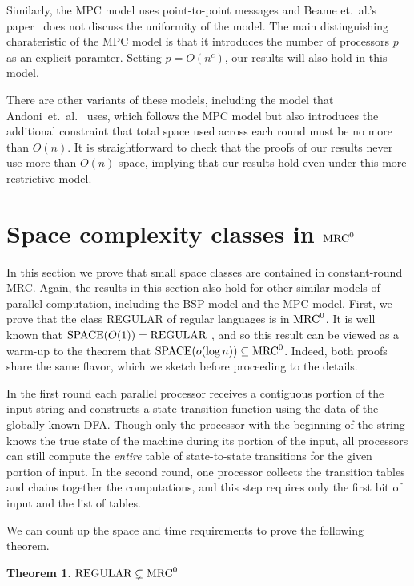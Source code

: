 \documentclass[11pt]{article}
\newtheorem{theorem}{Theorem}
\theoremstyle{definition}
\theoremstyle{remark}
\newcommand{\mrc}{\textup{MRC}}
\begin{document}
Similarly, the MPC model uses point-to-point messages and Beame et.~al.'s paper~\cite{BeameKS13} does not discuss the uniformity of the model.  The main distinguishing charateristic of the MPC model is that it introduces the number of processors $p$ as an explicit paramter.  Setting $p=O(n^c)$, our results will also hold in this model.

There are other variants of these models, including the model that Andoni~et.~al.~\cite{AndoniNOY14} uses, which follows the MPC model but also introduces the additional constraint that total space used across each round must be no more than $O(n)$.  It is straightforward to check that the proofs of our results never use more than $O(n)$ space, implying that our results hold even under this more restrictive model.

\section{Space complexity classes in $\mrc^0$} \label{sec:spacebound}

In this section we prove that small space classes are contained in
constant-round MRC.  Again, the results in this section also hold for other similar models of parallel computation, including the BSP model and the MPC model.  First, we prove that the class REGULAR of regular languages
is in $\mrc^0$. It is well known that $\textup{SPACE}(O(1)) = \textup{REGULAR}$
\cite{Shepherdson59}, and so this result can be viewed as a warm-up to the
theorem that $\textup{SPACE}(o(\log n)) \subseteq \mrc^0$. Indeed, both proofs
share the same flavor, which we sketch before proceeding to the details.

In the first round each parallel processor receives a contiguous portion of the
input string and constructs a state transition function using the data of the
globally known DFA. Though only the processor with the beginning of the string
knows the true state of the machine during its portion of the input, all
processors can still compute the \emph{entire} table of state-to-state
transitions for the given portion of input. In the second round, one processor
collects the transition tables and chains together the computations, and this
step requires only the first bit of input and the list of tables.

We can count up the space and time requirements to prove the following theorem.

\begin{theorem}\label{thm:reg}
   $\textup{REGULAR} \subsetneq \mrc^0$
\end{theorem}
\end{document}
